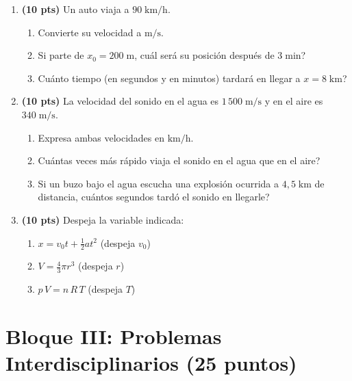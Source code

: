 \documentclass[12pt, letterpaper]{article}
\begin{document}
\begin{enumerate}[leftmargin=*]
  \item \textbf{(10 pts)} Un auto viaja a $90\;\text{km/h}$.
        \begin{enumerate}[label=\alph*)]
          \item Convierte su velocidad a $\text{m/s}$.
          \item Si parte de $x_0 = 200\;\text{m}$, \textquestiondown cuál será su posición después de $3\;\text{min}$?
          \item \textquestiondown Cuánto tiempo (en segundos y en minutos) tardará en llegar a $x = 8\;\text{km}$?
        \end{enumerate}

  \item \textbf{(10 pts)} La velocidad del sonido en el agua es $1\,500\;\text{m/s}$ y en el aire es $340\;\text{m/s}$.
        \begin{enumerate}[label=\alph*)]
          \item Expresa ambas velocidades en $\text{km/h}$.
          \item \textquestiondown Cuántas veces más rápido viaja el sonido en el agua que en el aire?
          \item Si un buzo bajo el agua escucha una explosión ocurrida a $4{,}5\;\text{km}$ de distancia, \textquestiondown cuántos segundos tardó el sonido en llegarle?
        \end{enumerate}

  \item \textbf{(10 pts)} Despeja la variable indicada:
        \begin{enumerate}[label=\alph*)]
          \item $x = v_0 t + \frac{1}{2}at^2$ \quad (despeja $v_0$)
          \item $V = \frac{4}{3}\pi r^3$ \quad (despeja $r$)
          \item $p\,V = n\,R\,T$ \quad (despeja $T$)
        \end{enumerate}
\end{enumerate}

\newpage

\section{Bloque III: Problemas Interdisciplinarios (25 puntos)}
\end{document}
